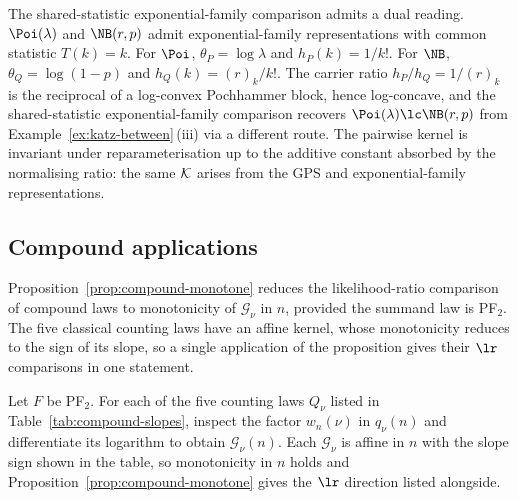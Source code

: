 \documentclass[11pt]{article}
\begin{document}
The shared-statistic exponential-family comparison admits a dual reading. \(\Poi(\lambda)\) and \(\NB(r,p)\) admit exponential-family representations with common statistic \(T(k)=k\). For \(\Poi\), \(\theta_P=\log\lambda\) and \(h_P(k)=1/k!\). For \(\NB\), \(\theta_Q=\log(1-p)\) and \(h_Q(k)=(r)_k/k!\). The carrier ratio \(h_P/h_Q=1/(r)_k\) is the reciprocal of a log-convex Pochhammer block, hence log-concave, and the shared-statistic exponential-family comparison recovers \(\Poi(\lambda)\lc\NB(r,p)\) from Example~\ref{ex:katz-between}\,\textup{(iii)} via a different route. The pairwise kernel is invariant under reparameterisation up to the additive constant absorbed by the normalising ratio: the same \({\cal K}\) arises from the GPS and exponential-family representations.

\subsection{Compound applications}
\label{sec:compound-applications}

Proposition~\ref{prop:compound-monotone} reduces the likelihood-ratio comparison of compound laws to monotonicity of \(\mathcal G_\nu\) in $n$, provided the summand law is PF$_2$. The five classical counting laws have an affine kernel, whose monotonicity reduces to the sign of its slope, so a single application of the proposition gives their $\lr$ comparisons in one statement.

\begin{example}
\label{ex:compound-rate}
Let \(F\) be PF$_2$. For each of the five  counting laws \(Q_\nu\) listed in Table~\ref{tab:compound-slopes}, inspect the factor \(w_n(\nu)\) in \(q_\nu(n)\) and differentiate its logarithm to obtain \(\mathcal G_\nu(n)\). Each \(\mathcal G_\nu\) is affine in \(n\) with the slope sign shown in the table, so monotonicity in \(n\) holds and Proposition~\ref{prop:compound-monotone} gives the \(\lr\) direction listed alongside.
\end{example}
\end{document}
